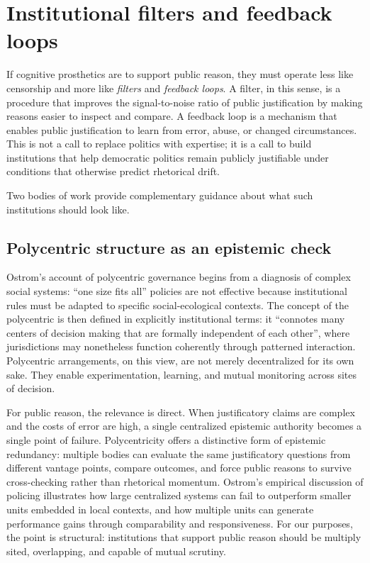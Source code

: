 \documentclass[12pt]{report}
\begin{document}
\section{Institutional filters and feedback loops}

If cognitive prosthetics are to support public reason, they must operate less like censorship and more like \emph{filters} and \emph{feedback loops}.
A filter, in this sense, is a procedure that improves the signal-to-noise ratio of public justification by making reasons easier to inspect and compare.
A feedback loop is a mechanism that enables public justification to learn from error, abuse, or changed circumstances.
This is not a call to replace politics with expertise; it is a call to build institutions that help democratic politics remain publicly justifiable under conditions that otherwise predict rhetorical drift.

Two bodies of work provide complementary guidance about what such institutions should look like.

\subsection{Polycentric structure as an epistemic check}

Ostrom’s account of polycentric governance begins from a diagnosis of complex social systems: \enquote{one size fits all} policies are not effective because institutional rules must be adapted to specific social-ecological contexts. \parencite[p.~642]{ostrom2010polycentric}
The concept of the polycentric is then defined in explicitly institutional terms: it \enquote{connotes many centers of decision making that are formally independent of each other}, where jurisdictions may nonetheless function coherently through patterned interaction. \parencite[p.~643]{ostrom2010polycentric}
Polycentric arrangements, on this view, are not merely decentralized for its own sake. They enable experimentation, learning, and mutual monitoring across sites of decision.

For public reason, the relevance is direct.
When justificatory claims are complex and the costs of error are high, a single centralized epistemic authority becomes a single point of failure.
Polycentricity offers a distinctive form of epistemic redundancy: multiple bodies can evaluate the same justificatory questions from different vantage points, compare outcomes, and force public reasons to survive cross-checking rather than rhetorical momentum.
Ostrom’s empirical discussion of policing illustrates how large centralized systems can fail to outperform smaller units embedded in local contexts, and how multiple units can generate performance gains through comparability and responsiveness. \parencite[pp.~644--645]{ostrom2010polycentric}
For our purposes, the point is structural: institutions that support public reason should be multiply sited, overlapping, and capable of mutual scrutiny.
\end{document}
